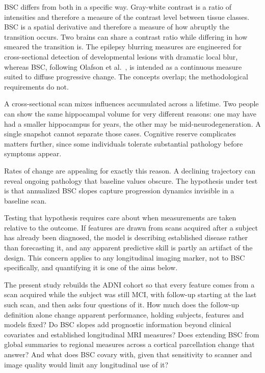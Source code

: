 \documentclass[blue]{ludusofficial}  %
\begin{document}
BSC differs from both in a specific way. Gray-white contrast is a ratio of intensities and therefore a measure of the contrast level between tissue classes. BSC is a spatial derivative and therefore a measure of how abruptly the transition occurs. Two brains can share a contrast ratio while differing in how smeared the transition is. The epilepsy blurring measures are engineered for cross-sectional detection of developmental lesions with dramatic local blur, whereas BSC, following Olafson et al.~\cite{olafson2021bsc}, is intended as a continuous measure suited to diffuse progressive change. The concepts overlap; the methodological requirements do not.

A cross-sectional scan mixes influences accumulated across a lifetime. Two people can show the same hippocampal volume for very different reasons: one may have had a smaller hippocampus for years, the other may be mid-neurodegeneration. A single snapshot cannot separate those cases. Cognitive reserve complicates matters further, since some individuals tolerate substantial pathology before symptoms appear.

Rates of change are appealing for exactly this reason. A declining trajectory can reveal ongoing pathology that baseline values obscure. The hypothesis under test is that annualized BSC slopes capture progression dynamics invisible in a baseline scan.

Testing that hypothesis requires care about when measurements are taken relative to the outcome. If features are drawn from scans acquired after a subject has already been diagnosed, the model is describing established disease rather than forecasting it, and any apparent predictive skill is partly an artifact of the design. This concern applies to any longitudinal imaging marker, not to BSC specifically, and quantifying it is one of the aims below.

The present study rebuilds the ADNI cohort so that every feature comes from a scan acquired while the subject was still MCI, with follow-up starting at the last such scan, and then asks four questions of it. How much does the follow-up definition alone change apparent performance, holding subjects, features and models fixed? Do BSC slopes add prognostic information beyond clinical covariates and established longitudinal MRI measures? Does extending BSC from global summaries to regional measures across a cortical parcellation change that answer? And what does BSC covary with, given that sensitivity to scanner and image quality would limit any longitudinal use of it?
\end{document}
